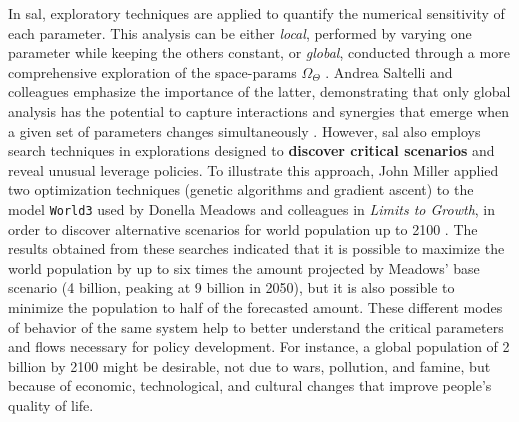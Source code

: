 \documentclass[./main_en.tex]{subfiles}
\begin{document}
\par In \gls{sal}, exploratory techniques are applied to quantify the numerical sensitivity of each parameter. This analysis can be either \textit{local}, performed by varying one parameter while keeping the others constant, or \textit{global}, conducted through a more comprehensive exploration of the \gls{space-params} $\Omega_{\Theta}$ \cite{Saltelli2006}. Andrea Saltelli and colleagues emphasize the importance of the latter, demonstrating that only global analysis has the potential to capture interactions and synergies that emerge when a given set of \gls{parameters} changes simultaneously \cite{Saltelli2019}. However, \gls{sal} also employs search techniques in explorations designed to \textbf{discover critical scenarios} and reveal unusual leverage policies. To illustrate this approach, John Miller applied two optimization techniques (genetic algorithms and gradient ascent) to the \gls{model} \texttt{World3} used by Donella Meadows and colleagues in \textit{Limits to Growth}, in order to discover alternative scenarios for world population up to 2100 \cite{miller1998}. The results obtained from these searches indicated that it is possible to maximize the world population by up to six times the amount projected by Meadows' base scenario (4 billion, peaking at 9 billion in 2050), but it is also possible to minimize the population to half of the forecasted amount. These different modes of behavior of the same \gls{system} help to better understand the critical \gls{parameters} and flows necessary for policy development. For instance, a global population of 2 billion by 2100 might be desirable, not due to wars, pollution, and famine, but because of economic, technological, and cultural changes that improve people's quality of life.
 
\end{document}
